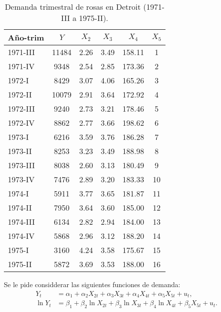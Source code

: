 \documentclass[10pt]{article}
\begin{document}
\begin{table}[H]
    \centering
    \begin{tabular}{lccccc}
        \hline
        \textbf{Año-trim} & $Y$ & $X_2$ & $X_3$ & $X_4$ & $X_5$ \\
        \hline
        1971-III & 11484 & 2.26 & 3.49 & 158.11 & 1 \\
        1971-IV  &  9348 & 2.54 & 2.85 & 173.36 & 2 \\
        1972-I   &  8429 & 3.07 & 4.06 & 165.26 & 3 \\
        1972-II  & 10079 & 2.91 & 3.64 & 172.92 & 4 \\
        1972-III &  9240 & 2.73 & 3.21 & 178.46 & 5 \\
        1972-IV  &  8862 & 2.77 & 3.66 & 198.62 & 6 \\
        1973-I   &  6216 & 3.59 & 3.76 & 186.28 & 7 \\
        1973-II  &  8253 & 3.23 & 3.49 & 188.98 & 8 \\
        1973-III &  8038 & 2.60 & 3.13 & 180.49 & 9 \\
        1973-IV  &  7476 & 2.89 & 3.20 & 183.33 & 10 \\
        1974-I   &  5911 & 3.77 & 3.65 & 181.87 & 11 \\
        1974-II  &  7950 & 3.64 & 3.60 & 185.00 & 12 \\
        1974-III &  6134 & 2.82 & 2.94 & 184.00 & 13 \\
        1974-IV  &  5868 & 2.96 & 3.12 & 188.20 & 14 \\
        1975-I   &  3160 & 4.24 & 3.58 & 175.67 & 15 \\
        1975-II  &  5872 & 3.69 & 3.53 & 188.00 & 16 \\
        \hline
    \end{tabular}
    \caption{Demanda trimestral de rosas en Detroit (1971-III a 1975-II).}
    \label{tab:demanda_rosas}
\end{table}

Se le pide considderar las siguientes funciones de demanda:
\begin{align*}
    Y_t &= \alpha_1 + \alpha_2 X_{2t} + \alpha_3 X_{3t} + \alpha_4 X_{4t} + \alpha_5 X_{5t} + u_t, \\
    \ln Y_t &= \beta_1 + \beta_2 \ln X_{2t} + \beta_3 \ln X_{3t} + \beta_4 \ln X_{4t} + \beta_5 X_{5t} + u_t.
\end{align*}
\end{document}
